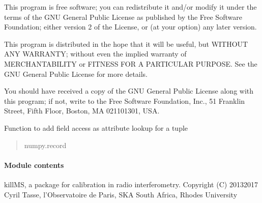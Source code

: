 \documentclass[letterpaper,10pt,english]{sphinxmanual}
\begin{document}
\sphinxAtStartPar
This program is free software; you can redistribute it and/or
modify it under the terms of the GNU General Public License
as published by the Free Software Foundation; either version 2
of the License, or (at your option) any later version.

\sphinxAtStartPar
This program is distributed in the hope that it will be useful,
but WITHOUT ANY WARRANTY; without even the implied warranty of
MERCHANTABILITY or FITNESS FOR A PARTICULAR PURPOSE.  See the
GNU General Public License for more details.

\sphinxAtStartPar
You should have received a copy of the GNU General Public License
along with this program; if not, write to the Free Software
Foundation, Inc., 51 Franklin Street, Fifth Floor, Boston, MA  02110\sphinxhyphen{}1301, USA.

\begin{fulllineitems}
\label{\detokenize{api/killMS.Array:killMS.Array.RecArrayOps.AppendField}}
\pysigstartsignatures
{}
\pysigstopsignatures
\sphinxAtStartPar
Function to add field access as attribute lookup for a tuple
\begin{quote}\begin{description}
\sphinxAtStartPar
numpy.record

\end{description}\end{quote}

\end{fulllineitems}



\paragraph{Module contents}
\label{\detokenize{api/killMS.Array:module-killMS.Array}}\label{\detokenize{api/killMS.Array:module-contents}}
\sphinxAtStartPar
killMS, a package for calibration in radio interferometry.
Copyright (C) 2013\sphinxhyphen{}2017  Cyril Tasse, l’Observatoire de Paris,
SKA South Africa, Rhodes University
\end{document}
